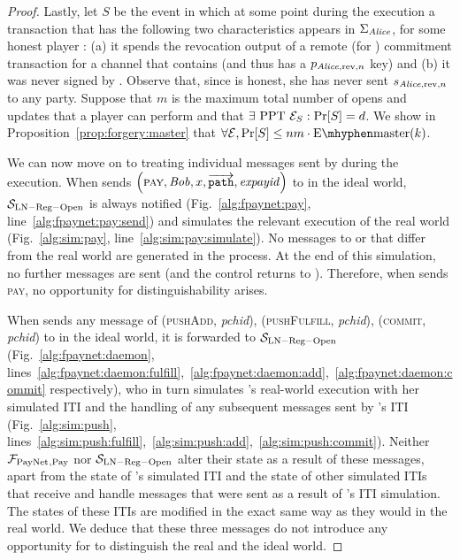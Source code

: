 \begin{proof}
  Lastly, let $S$ be the event in which at some point during the execution a
  transaction that has the following two characteristics appears in
  $\Sigma_{\mathit{Alice}}$, for some honest player \alice: (a) it spends the revocation
  output of a remote (for \alice{}) commitment transaction for a channel that
  contains \alice{} (and thus has a $p_{\mathit{Alice}, \mathrm{rev}, n}$ key) and (b)
  it was never signed by \alice. Observe that, since \alice{} is honest, she has
  never sent $s_{\mathit{Alice}, \mathrm{rev}, n}$ to any party. Suppose that $m$ is the
  maximum total number of opens and updates that a player can perform and that
  $\exists \text{ PPT } \mathcal{E}_S: \Pr[S] = d$. We show in
  Proposition~\ref{prop:forgery:master} that $\forall \environment, \Pr[S] \leq
  nm \cdot \mathrm{E \mhyphen master}(k)$.

  We can now move on to treating individual messages sent by \environment{}
  during the execution. When \environment{} sends $\left(\textsc{pay}, \mathit{Bob}, x,
  \overrightarrow{\mathtt{path}}, \mathit{expayid}\right)$ to \alice{} in the
  ideal world, $\mathcal{S}_{\mathrm{LN - Reg - Open}}$ is always notified
  (Fig.~\ref{alg:fpaynet:pay}, line~\ref{alg:fpaynet:pay:send}) and simulates
  the relevant execution of the real world (Fig.~\ref{alg:sim:pay},
  line~\ref{alg:sim:pay:simulate}). No messages to \ledger{} or \environment{}
  that differ from the real world are generated in the process. At the end of
  this simulation, no further messages are sent (and the control returns to
  \environment). Therefore, when \environment{} sends \textsc{pay}, no
  opportunity for distinguishability arises.

  When \environment{} sends any message of (\textsc{pushAdd}, \textit{pchid}),
  (\textsc{pushFulfill}, \textit{pchid}), (\textsc{commit}, \textit{pchid}) to
  \alice{} in the ideal world, it is forwarded to $\mathcal{S}_{\mathrm{LN - Reg
  - Open}}$ (Fig.~\ref{alg:fpaynet:daemon},
  lines~\ref{alg:fpaynet:daemon:fulfill},~\ref{alg:fpaynet:daemon:add},~\ref{alg:fpaynet:daemon:commit}
  respectively), who in turn simulates \alice's real-world execution with her
  simulated ITI and the handling of any subsequent messages sent by \alice's ITI
  (Fig.~\ref{alg:sim:push},
  lines~\ref{alg:sim:push:fulfill},~\ref{alg:sim:push:add},~\ref{alg:sim:push:commit}).
  Neither $\mathcal{F}_{\mathrm{PayNet}}{}_{\mathrm{, Pay}}$ nor $\mathcal{S}_{\mathrm{LN - Reg -
  Open}}$ alter their state as a result of these messages, apart from the state
  of \alice's simulated ITI and the state of other simulated ITIs that receive
  and handle messages that were sent as a result of \alice's ITI simulation. The
  states of these ITIs are modified in the exact same way as they would in the
  real world. We deduce that these three messages do not introduce any
  opportunity for \environment{} to distinguish the real and the ideal world.


\end{proof}
